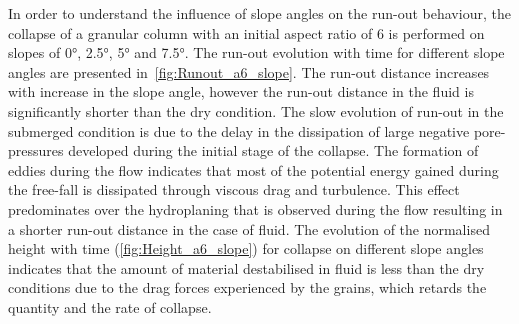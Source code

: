 In order to understand the influence of slope angles on the run-out behaviour, 
the collapse of a granular column with an initial aspect ratio of 6 is 
performed on slopes of 0\si{\degree}, 2.5\si{\degree}, 5\si{\degree} and 
7.5\si{\degree}. The run-out evolution with time for different slope angles are 
presented in~\cref{fig:Runout_a6_slope}. The run-out distance increases with 
increase in the slope angle, however the run-out distance in the fluid is 
significantly shorter than the dry condition. The slow evolution of run-out in 
the submerged condition is due to the delay in the dissipation of large 
negative pore-pressures developed during the initial stage of the collapse. The 
formation of eddies during the flow indicates that most of the potential energy 
gained during the free-fall is dissipated through viscous drag and turbulence. 
This effect predominates over the hydroplaning that is observed during 
the flow resulting in a shorter run-out distance in the case of fluid. The 
evolution of the normalised height with time (\cref{fig:Height_a6_slope}) for 
collapse on different slope angles indicates that the 
amount of material destabilised in fluid is less than the dry conditions due to 
the drag forces experienced by the grains, which retards the quantity and the 
rate of collapse.

